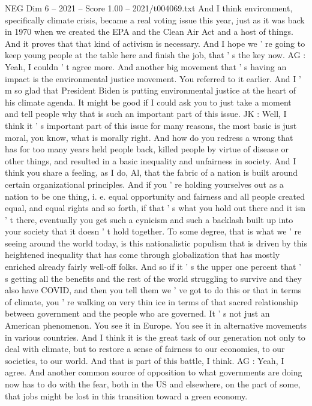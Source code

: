 \begin{textsample}{NEG Dim 6 – 2021 – Score 1.00 – 2021/t004069.txt}
And I think environment, specifically climate crisis, became a real voting issue this year, just as it was back in 1970 when we created the EPA and the Clean Air Act and a host of things.
And it proves that that kind of activism is necessary.
And I hope we ' re going to keep young people at the table here and finish the job, that ' s the key now.
AG : Yeah, I couldn ' t agree more.
And another big movement that ' s having an impact is the environmental justice movement.
You referred to it earlier.
And I ' m so glad that President Biden is putting environmental justice at the heart of his climate agenda.
It might be good if I could ask you to just take a moment and tell people why that is such an important part of this issue.
JK : Well, I think it ' s important part of this issue for many reasons, the most basic is just moral, you know, what is morally right.
And how do you redress a wrong that has for too many years held people back, killed people by virtue of disease or other things, and resulted in a basic inequality and unfairness in society.
And I think you share a feeling, as I do, Al, that the fabric of a nation is built around certain organizational principles.
And if you ' re holding yourselves out as a nation to be one thing, i. e. equal opportunity and fairness and all people created equal, and equal rights and so forth, if that ' s what you hold out there and it isn ' t there, eventually you get such a cynicism and such a backlash built up into your society that it doesn ' t hold together.
To some degree, that is what we ' re seeing around the world today, is this nationalistic populism that is driven by this heightened inequality that has come through globalization that has mostly enriched already fairly well-off folks.
And so if it ' s the upper one percent that ' s getting all the benefits and the rest of the world struggling to survive and they also have COVID, and then you tell them we ' ve got to do this or that in terms of climate, you ' re walking on very thin ice in terms of that sacred relationship between government and the people who are governed.
It ' s not just an American phenomenon.
You see it in Europe.
You see it in alternative movements in various countries.
And I think it is the great task of our generation not only to deal with climate, but to restore a sense of fairness to our economies, to our societies, to our world.
And that is part of this battle, I think.
AG : Yeah, I agree.
And another common source of opposition to what governments are doing now has to do with the fear, both in the US and elsewhere, on the part of some, that jobs might be lost in this transition toward a green economy.

\end{textsample}

